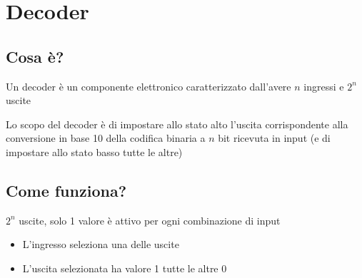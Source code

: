 \newpage
\section{Decoder}
\subsection{Cosa è?}
Un decoder è un componente elettronico caratterizzato dall'avere $n$ ingressi e $2^n$ uscite

Lo scopo del decoder è di impostare allo stato alto l'uscita corrispondente alla conversione in base 10 della codifica binaria a $n$ bit ricevuta in input (e di impostare allo stato basso tutte le altre)

\subsection{Come funziona?}
$2^n$ uscite, solo 1 valore è attivo per ogni combinazione di input
\begin{itemize}
    \item L'ingresso seleziona una delle uscite
    \item L'uscita selezionata ha valore 1 tutte le altre 0
\end{itemize}

\vspace{0.5cm}

